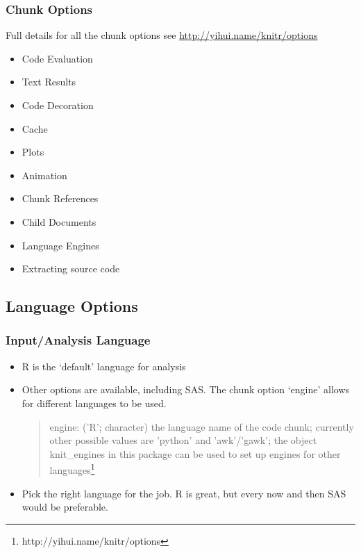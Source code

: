 \documentclass[t]{beamer}\usepackage[]{graphicx}\usepackage[]{color}
\begin{document}
\begin{frame}
  \frametitle{Chunk Options}
  Full details for all the chunk options see
  \url{http://yihui.name/knitr/options}
  \begin{itemize}
    \item Code Evaluation
    \item Text Results
    \item Code Decoration
    \item Cache
    \item Plots
    \item Animation
    \item Chunk References
    \item Child Documents
    \item Language Engines
    \item Extracting source code
  \end{itemize}
\end{frame}

\subsection{Language Options}
\begin{frame}
  \frametitle{Input/Analysis Language}
  \begin{itemize}
    \item R is the `default' language for analysis 
    \item Other options are available, including SAS.  The chunk option `engine'
      allows for different languages to be used.

      \begin{quote}
        engine: ('R'; character) the language name of the code chunk; currently
        other possible values are 'python' and 'awk'/'gawk'; the object
        knit\_engines in this package can be used to set up engines for other
        languages\footnote{http://yihui.name/knitr/options}
      \end{quote}

    \item Pick the right language for the job.  R is great, but every now and
      then SAS would be preferable.  
  \end{itemize}
\end{frame}
\end{document}
